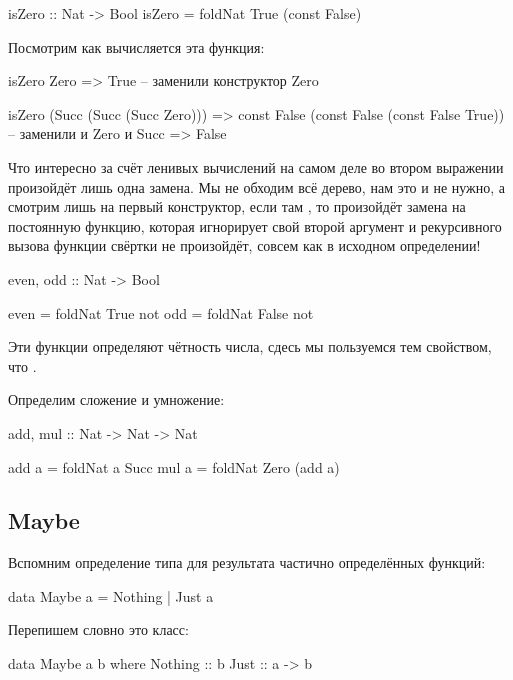 \begin{code}
isZero :: Nat -> Bool
isZero = foldNat True (const False)
\end{code}

Посмотрим как вычисляется эта функция:


\begin{code}
        isZero Zero
=>      True            -- заменили конструктор Zero

        isZero (Succ (Succ (Succ Zero)))
=>      const False (const False (const False True))
                        -- заменили и Zero и Succ
=>      False
\end{code}

Что интересно за счёт ленивых вычислений на самом деле во втором
выражении произойдёт лишь одна замена. Мы не обходим всё дерево, нам это
и не нужно, а смотрим лишь на первый конструктор, если там , то
произойдёт замена на постоянную функцию, которая игнорирует свой второй
аргумент и рекурсивного вызова функции свёртки не произойдёт, совсем как
в исходном определении!


\begin{code}
even, odd :: Nat -> Bool

even    = foldNat True  not
odd     = foldNat False not
\end{code}

Эти функции определяют чётность числа, сдесь мы пользуемся тем
свойством, что .

Определим сложение и умножение:


\begin{code}
add, mul :: Nat -> Nat -> Nat

add a  = foldNat a     Succ
mul a  = foldNat Zero  (add a)
\end{code}

\subsection{Maybe}

Вспомним определение типа для результата частично определённых функций:


\begin{code}
data Maybe a = Nothing | Just a
\end{code}

Перепишем словно это класс:


\begin{code}
data Maybe a b where
    Nothing :: b
    Just    :: a -> b
\end{code}

